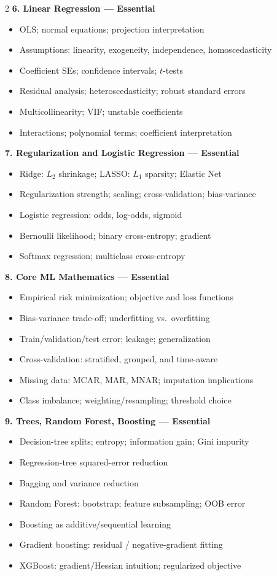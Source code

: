 \documentclass[9pt,a4paper]{article}
\newcommand{\topic}[1]{%
    \vspace{2.2mm}
    {\large\bfseries #1}\par
    \vspace{0.5mm}
}
\begin{document}
\begin{multicols}{2}
\topic{6. Linear Regression --- Essential}
\begin{itemize}
    \item OLS; normal equations; projection interpretation
    \item Assumptions: linearity, exogeneity, independence, homoscedasticity
    \item Coefficient SEs; confidence intervals; $t$-tests
    \item Residual analysis; heteroscedasticity; robust standard errors
    \item Multicollinearity; VIF; unstable coefficients
    \item Interactions; polynomial terms; coefficient interpretation
\end{itemize}

\topic{7. Regularization and Logistic Regression --- Essential}
\begin{itemize}
    \item Ridge: $L_2$ shrinkage; LASSO: $L_1$ sparsity; Elastic Net
    \item Regularization strength; scaling; cross-validation; bias-variance
    \item Logistic regression: odds, log-odds, sigmoid
    \item Bernoulli likelihood; binary cross-entropy; gradient
    \item Softmax regression; multiclass cross-entropy
\end{itemize}

\columnbreak

\topic{8. Core ML Mathematics --- Essential}
\begin{itemize}
    \item Empirical risk minimization; objective and loss functions
    \item Bias-variance trade-off; underfitting vs.\ overfitting
    \item Train/validation/test error; leakage; generalization
    \item Cross-validation: stratified, grouped, and time-aware
    \item Missing data: MCAR, MAR, MNAR; imputation implications
    \item Class imbalance; weighting/resampling; threshold choice
\end{itemize}

\topic{9. Trees, Random Forest, Boosting --- Essential}
\begin{itemize}
    \item Decision-tree splits; entropy; information gain; Gini impurity
    \item Regression-tree squared-error reduction
    \item Bagging and variance reduction
    \item Random Forest: bootstrap; feature subsampling; OOB error
    \item Boosting as additive/sequential learning
    \item Gradient boosting: residual / negative-gradient fitting
    \item XGBoost: gradient/Hessian intuition; regularized objective
\end{itemize}


\end{multicols}
\end{document}
